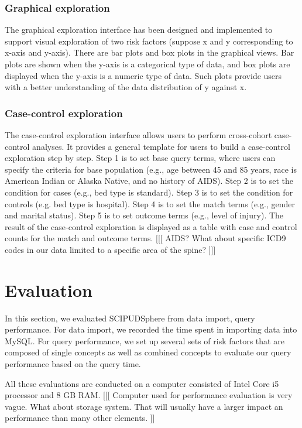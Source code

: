 \documentclass{amia}
\begin{document}
\subsubsection{Graphical exploration}
The graphical exploration interface has been designed and implemented to support visual exploration of two risk factors (suppose x and y corresponding to x-axis and y-axis). There are bar plots and box plots in the graphical views. Bar plots are shown when the y-axis is a categorical type of data, and box plots are displayed when the y-axis is a numeric type of data. Such plots provide users with a better understanding of the data distribution of y against x.

\subsubsection{Case-control exploration}
The case-control exploration interface allows users to perform cross-cohort case-
control analyses. It provides a general template for users to build a case-control
exploration step by step. Step 1 is to set base query terms, where users can specify the criteria for base population (e.g., age between 45 and 85 years, race is American Indian or Alaska Native, and no history of AIDS). Step 2 is to set the condition for cases (e.g., bed type is standard). Step 3 is to set the condition for controls (e.g. bed type is hospital). Step 4 is to set the match terms (e.g., gender and marital status). Step 5 is to set outcome terms (e.g., level of injury). The result of the case-control exploration is displayed as a table with case and control counts for the match and outcome terms. [[[ AIDS?  What about specific ICD9 codes in our data limited to a specific area of the spine? ]]]


\section{Evaluation}
In this section, we evaluated SCIPUDSphere from data import, query performance. For data import, we recorded the time spent in importing data into MySQL. For query performance, we set up several sets of risk factors that are composed of single concepts as well as combined concepts to evaluate our query performance based on the query time.

All these evaluations are conducted on a computer consisted of Intel Core i5 processor and 8 GB RAM.  [[[ Computer used for performance evaluation is very vague.  What about storage system.  That will usually have a larger impact an performance than many other elements. ]]
  
\end{document}

